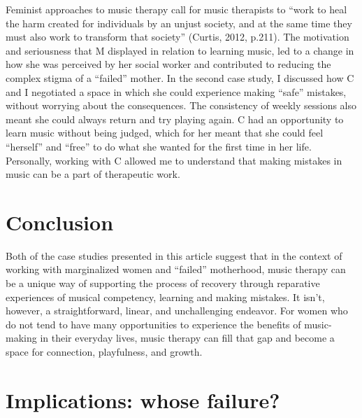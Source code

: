 \documentclass[authordate, empirical]{jote-new-article}
\begin{document}
	Feminist approaches to music therapy call for music therapists to “work to heal the harm created for individuals by an unjust society, and at the same time they must also work to transform that society” (Curtis, 2012, p.211). The motivation and seriousness that M displayed in relation to learning music, led to a change in how she was perceived by her social worker and contributed to reducing the complex stigma of a “failed” mother. In the second case study, I discussed how C and I negotiated a space in which she could experience making “safe” mistakes, without worrying about the consequences. The consistency of weekly sessions also meant she could always return and try playing again. C had an opportunity to learn music without being judged, which for her meant that she could feel “herself” and “free” to do what she wanted for the first time in her life. Personally, working with C allowed me to understand that making mistakes in music can be a part of therapeutic work.







	\section{Conclusion}







	Both of the case studies presented in this article suggest that in the context of working with marginalized women and “failed” motherhood, music therapy can be a unique way of supporting the process of recovery through reparative experiences of musical competency, learning and making mistakes. It isn't, however, a straightforward, linear, and unchallenging endeavor. For women who do not tend to have many opportunities to experience the benefits of music-making in their everyday lives, music therapy can fill that gap and become a space for connection, playfulness, and growth.







	\section{Implications: whose failure?}
\end{document}

